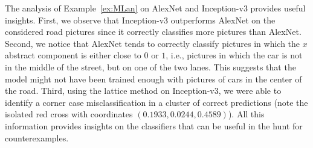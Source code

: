 The analysis of Example~\ref{ex:MLan} on AlexNet and Inception-v3 provides useful insights.
First, we observe that Inception-v3 outperforms AlexNet on the considered road pictures since it correctly classifies
more pictures than AlexNet. Second, we notice that AlexNet tends to correctly classify pictures in 
which the $x$ abstract component is either close to $0$ or $1$, i.e., pictures in which the car is not in 
the middle of the street, but on one of the two lanes. This suggests that the model might not have been
trained enough with pictures of cars in the center of the road. Third, using the lattice method on Inception-v3,
we were able to identify a corner case misclassification in a cluster of correct predictions
(note the isolated red cross with coordinates $(0.1933 ,0.0244,0.4589)$).
All this information provides insights on the classifiers that can be useful in the hunt for counterexamples. %
